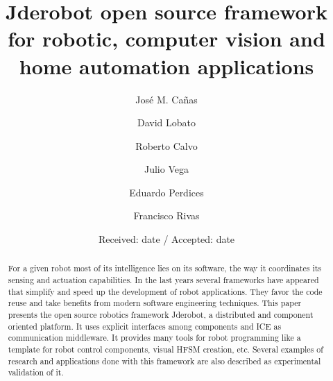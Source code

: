 \documentclass[twocolumn]{svjour3}          %
\begin{document}
\title{Jderobot open source framework for robotic, computer vision and home automation applications
}


\author{Jos\'e M. Ca\~nas \and David Lobato \and Roberto Calvo \and Julio Vega \and Eduardo Perdices \and Francisco Rivas}



\date{Received: date / Accepted: date}


\maketitle

\begin{abstract}
For a given robot most of its intelligence lies on its software, the way it coordinates its sensing and actuation capabilities. In the last years several frameworks have appeared that simplify and speed up the development of robot applications. They favor the code reuse and take benefits from modern software engineering techniques. This paper presents the open source robotics framework Jderobot, a distributed and component oriented platform. It uses explicit interfaces among components and ICE as communication middleware. It provides many tools for robot programming like a template for robot control components, visual HFSM creation, etc. Several examples of research and applications done with this framework are also described as experimental validation of it.
\end{abstract}
\end{document}
